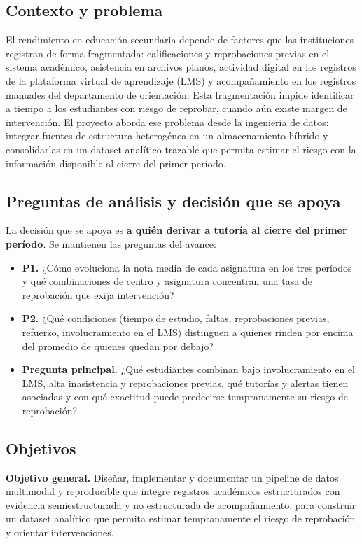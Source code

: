 \documentclass[11pt,a4paper]{article}
\begin{document}
\subsection{Contexto y problema}
El rendimiento en educación secundaria depende de factores que las instituciones registran de forma
fragmentada: calificaciones y reprobaciones previas en el sistema académico, asistencia en archivos
planos, actividad digital en los registros de la plataforma virtual de aprendizaje (LMS) y
acompañamiento en los registros manuales del departamento de orientación. Esta fragmentación impide
identificar a tiempo a los estudiantes con riesgo de reprobar, cuando aún existe margen de
intervención. El proyecto aborda ese problema desde la ingeniería de datos: integrar fuentes de
estructura heterogénea en un almacenamiento híbrido y consolidarlas en un dataset analítico
trazable que permita estimar el riesgo con la información disponible al cierre del primer período.

\subsection{Preguntas de análisis y decisión que se apoya}
La decisión que se apoya es \textbf{a quién derivar a tutoría al cierre del primer período}. Se
mantienen las preguntas del avance:
\begin{itemize}
\item \textbf{P1.} ¿Cómo evoluciona la nota media de cada asignatura en los tres períodos y qué
combinaciones de centro y asignatura concentran una tasa de reprobación que exija intervención?
\item \textbf{P2.} ¿Qué condiciones (tiempo de estudio, faltas, reprobaciones previas, refuerzo,
involucramiento en el LMS) distinguen a quienes rinden por encima del promedio de quienes quedan por debajo?
\item \textbf{Pregunta principal.} ¿Qué estudiantes combinan bajo involucramiento en el LMS, alta
inasistencia y reprobaciones previas, qué tutorías y alertas tienen asociadas y con qué exactitud
puede predecirse tempranamente su riesgo de reprobación?
\end{itemize}

\subsection{Objetivos}
\textbf{Objetivo general.} Diseñar, implementar y documentar un pipeline de datos multimodal y
reproducible que integre registros académicos estructurados con evidencia semiestructurada y no
estructurada de acompañamiento, para construir un dataset analítico que permita estimar
tempranamente el riesgo de reprobación y orientar intervenciones.
\end{document}
